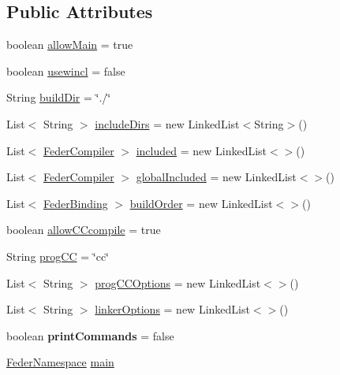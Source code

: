 \subsection*{Public Attributes}
\begin{DoxyCompactItemize}
\item 
boolean \hyperlink{classfeder_1_1FederCompiler_a5ee5791f203fe9785e84558b0ca1eb51}{allow\+Main} = true
\item 
boolean \hyperlink{classfeder_1_1FederCompiler_aa2d3d96c99a1a600acdcdc5c0fc3910e}{usewincl} = false
\item 
String \hyperlink{classfeder_1_1FederCompiler_a6bd58a0bde5e940c88c2865bf64bebd8}{build\+Dir} = \char`\"{}./\char`\"{}
\item 
List$<$ String $>$ \hyperlink{classfeder_1_1FederCompiler_a38f7cfc41d820998a340814766d251c3}{include\+Dirs} = new Linked\+List$<$String$>$()
\item 
List$<$ \hyperlink{classfeder_1_1FederCompiler}{Feder\+Compiler} $>$ \hyperlink{classfeder_1_1FederCompiler_a4509ee4224d7822411d242ae342a316e}{included} = new Linked\+List$<$$>$()
\item 
List$<$ \hyperlink{classfeder_1_1FederCompiler}{Feder\+Compiler} $>$ \hyperlink{classfeder_1_1FederCompiler_abc41d1f375e7b851bc3967833650ec7b}{global\+Included} = new Linked\+List$<$$>$()
\item 
List$<$ \hyperlink{classfeder_1_1types_1_1FederBinding}{Feder\+Binding} $>$ \hyperlink{classfeder_1_1FederCompiler_ab971df77c967493bc7aa312233aeb24a}{build\+Order} = new Linked\+List$<$$>$()
\item 
boolean \hyperlink{classfeder_1_1FederCompiler_a41515b8539e22e6899993b574a10e203}{allow\+C\+Ccompile} = true
\item 
String \hyperlink{classfeder_1_1FederCompiler_a00a0ae826fb482e7c2c1ecbfde051218}{prog\+CC} = \char`\"{}cc\char`\"{}
\item 
List$<$ String $>$ \hyperlink{classfeder_1_1FederCompiler_a59d4d26003b722044c7d36a09c2c36e8}{prog\+C\+C\+Options} = new Linked\+List$<$$>$()
\item 
List$<$ String $>$ \hyperlink{classfeder_1_1FederCompiler_a71296ee1ff3cf6efff0bafb76b2e7f4c}{linker\+Options} = new Linked\+List$<$$>$()
\item 
\mbox{\label{classfeder_1_1FederCompiler_a448b8b53998b4607ae197ede3ef4310f}} 
boolean {\bfseries print\+Commands} = false
\item 
\hyperlink{classfeder_1_1types_1_1FederNamespace}{Feder\+Namespace} \hyperlink{classfeder_1_1FederCompiler_ae1ddfe80b0facbe91b5d0d9ab62882a5}{main}
$$
\end{DoxyCompactItemize}
